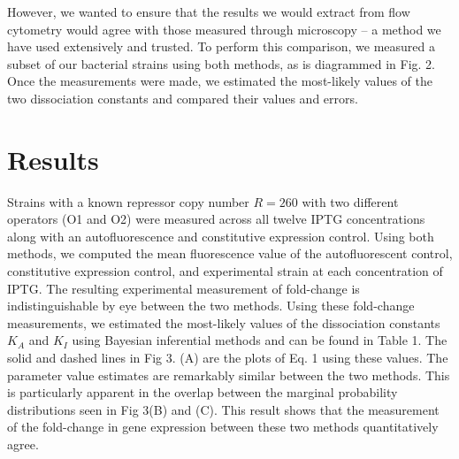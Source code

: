 \documentclass[letterpaper, 10pt]{article}
\begin{document}
However, we wanted to ensure that the results we would extract from flow
cytometry would agree with those measured through microscopy -- a method we
have used extensively and trusted. To perform this comparison, we measured a
subset of our bacterial strains using both methods, as is diagrammed in Fig. 2.
Once the measurements were made, we estimated the most-likely values of the
two dissociation constants and compared their values and errors.


\begin{figure}
\label{fig:flowchart}
\end{figure}

\section*{Results}
Strains with a known repressor copy number $R=260$ with two different operators
(O1 and O2) were measured across all twelve IPTG concentrations along with an
autofluorescence and constitutive expression control. Using both methods, we
computed the mean fluorescence value of the autofluorescent control,
constitutive expression control, and experimental strain at each concentration of
IPTG. The resulting experimental measurement of fold-change is indistinguishable by eye
between the two methods. Using these fold-change measurements, we estimated the
most-likely values of the dissociation constants
$K_A$ and $K_I$ using Bayesian inferential methods and can be found in Table 1.
The solid and dashed lines in Fig 3. (A) are the plots of Eq. 1 using these values.
The parameter value estimates are remarkably similar between the two methods. This
is particularly apparent in the overlap between the marginal probability distributions
seen in Fig 3(B) and (C). This result shows that the measurement of the fold-change
in gene expression between these two methods quantitatively agree.
\end{document}
